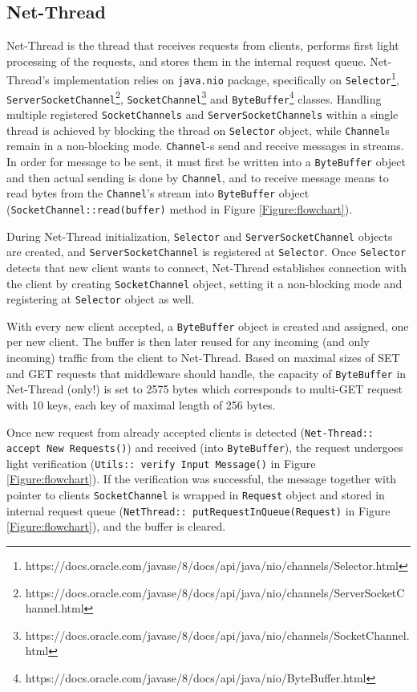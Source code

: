 \documentclass[11pt,a4paper]{article}
\begin{document}
\subsection{Net-Thread}

Net-Thread is the thread that receives requests from clients, performs first light processing of the requests, and stores them in the internal request queue. Net-Thread's implementation relies on \texttt{java.nio} package, specifically on \texttt{Selector}\footnote{https://docs.oracle.com/javase/8/docs/api/java/nio/channels/Selector.html}, \texttt{ServerSocketChannel}\footnote{https://docs.oracle.com/javase/8/docs/api/java/nio/channels/ServerSocketChannel.html}, \texttt{SocketChannel}\footnote{https://docs.oracle.com/javase/8/docs/api/java/nio/channels/SocketChannel.html} and \texttt{ByteBuffer}\footnote{https://docs.oracle.com/javase/8/docs/api/java/nio/ByteBuffer.html} classes. Handling multiple registered \texttt{SocketChannels} and \texttt{ServerSocketChannels} within a single thread is achieved by blocking the thread on \texttt{Selector} object, while \texttt{Channel}s remain in a non-blocking mode. \texttt{Channel}-s send and receive messages in streams. In order for message to be sent, it must first be written into a \texttt{ByteBuffer} object and then actual sending is done by \texttt{Channel}, and to receive message means to read bytes from the \texttt{Channel}'s stream into \texttt{ByteBuffer} object (\texttt{SocketChannel::read(buffer)} method in Figure \ref{Figure:flowchart}).

During Net-Thread initialization, \texttt{Selector} and \texttt{ServerSocketChannel} objects are created, and \texttt{ServerSocketChannel} is registered at \texttt{Selector}. Once \texttt{Selector} detects that new client wants to connect, Net-Thread establishes connection with the client by creating \texttt{SocketChannel} object, setting it a non-blocking mode and registering at \texttt{Selector} object as well.

With every new client accepted, a \texttt{ByteBuffer} object is created and assigned, one per new client. The buffer is then later reused for any incoming (and only incoming) traffic from the client to Net-Thread. Based on maximal sizes of SET and GET requests that middleware should handle, the capacity of \texttt{ByteBuffer} in Net-Thread (only!) is set to 2575 bytes which corresponds to multi-GET request with 10 keys, each key of maximal length of 256 bytes. 

Once new request from already accepted clients is detected (\texttt{Net-Thread:: accept New Requests()}) and received (into \texttt{ByteBuffer}), the request undergoes light verification (\texttt{Utils:: verify Input Message()} in Figure \ref{Figure:flowchart}). If the verification was successful, the message together with pointer to clients \texttt{SocketChannel} is wrapped in \texttt{Request} object and stored in internal request queue (\texttt{NetThread:: putRequestInQueue(Request)} in Figure \ref{Figure:flowchart}), and the buffer is cleared.
\end{document}
